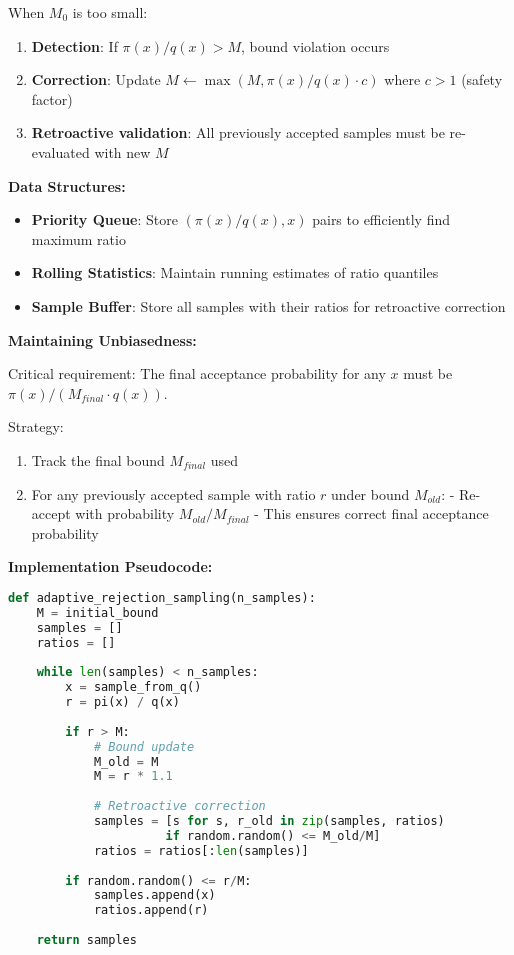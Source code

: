 \documentclass[11pt]{article}
\begin{document}
When $M_0$ is too small:
\begin{enumerate}
\item \textbf{Detection}: If $\pi(x)/q(x) > M$, bound violation occurs
\item \textbf{Correction}: Update $M \gets \max(M, \pi(x)/q(x) \cdot c)$ where $c > 1$ (safety factor)
\item \textbf{Retroactive validation}: All previously accepted samples must be re-evaluated with new $M$
\end{enumerate}

\textbf{Data Structures:}
\begin{itemize}
\item \textbf{Priority Queue}: Store $(\pi(x)/q(x), x)$ pairs to efficiently find maximum ratio
\item \textbf{Rolling Statistics}: Maintain running estimates of ratio quantiles
\item \textbf{Sample Buffer}: Store all samples with their ratios for retroactive correction
\end{itemize}

\textbf{Maintaining Unbiasedness:}

Critical requirement: The final acceptance probability for any $x$ must be $\pi(x)/(M_{final} \cdot q(x))$.

Strategy:
\begin{enumerate}
\item Track the final bound $M_{final}$ used
\item For any previously accepted sample with ratio $r$ under bound $M_{old}$:
   - Re-accept with probability $M_{old}/M_{final}$
   - This ensures correct final acceptance probability
\end{enumerate}

\textbf{Implementation Pseudocode:}
\begin{lstlisting}[language=Python, basicstyle=\small]
def adaptive_rejection_sampling(n_samples):
    M = initial_bound
    samples = []
    ratios = []
    
    while len(samples) < n_samples:
        x = sample_from_q()
        r = pi(x) / q(x)
        
        if r > M:
            # Bound update
            M_old = M
            M = r * 1.1
            
            # Retroactive correction
            samples = [s for s, r_old in zip(samples, ratios) 
                      if random.random() <= M_old/M]
            ratios = ratios[:len(samples)]
        
        if random.random() <= r/M:
            samples.append(x)
            ratios.append(r)
    
    return samples
\end{lstlisting}
\end{document}

